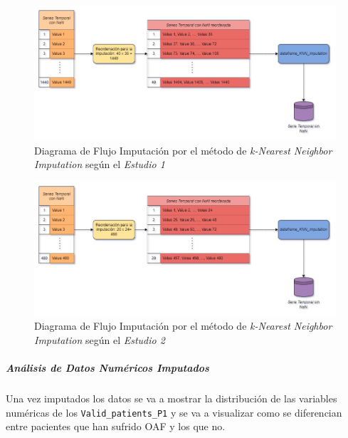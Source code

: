\newpage
\thispagestyle{empty}
\begin{landscape}
    \begin{figure}[H]
        \centering
        \includegraphics[scale = 0.5]{./img/knn-diagram-e1.jpg}
        \caption{Diagrama de Flujo Imputación por el método de \textit{k-Nearest Neighbor Imputation} según el \textit{Estudio 1}}
        \label{fig:knn-diagram-e1}
    \end{figure}
    \begin{figure}[H]
        \centering
        \includegraphics[scale = 0.5]{./img/knn-diagram-e2.jpg}
        \caption{Diagrama de Flujo Imputación por el método de \textit{k-Nearest Neighbor Imputation} según el \textit{Estudio 2}}
        \label{fig:knn-diagram-e2}
    \end{figure}
\end{landscape}
\restoregeometry 

\subparagraph{Análisis de Datos Numéricos Imputados}

Una vez imputados los datos se va a mostrar la distribución de las variables numéricas de los \texttt{Valid\_patients\_P1} y se va a visualizar como se diferencian entre pacientes que han sufrido OAF y los que no. 

